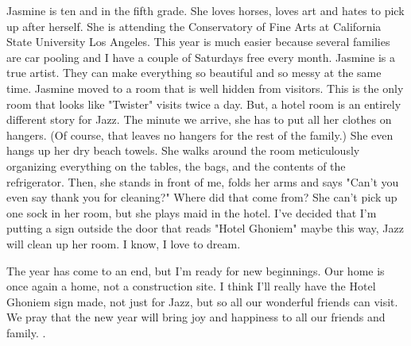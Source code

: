 Jasmine is ten and in the fifth grade.   She loves horses, loves art and hates to pick up after herself. She is attending the Conservatory of
Fine Arts at California State University Los Angeles. This year is much easier because several families are car pooling and I have a couple of
Saturdays free every month. Jasmine is a true artist. They can make everything so beautiful and so messy at the same time.   Jasmine moved to a
room that is well hidden from visitors. This is the only room that looks like "Twister" visits twice a day. But, a hotel room is an entirely
different story for Jazz. The minute we arrive, she has to put all her clothes on hangers. (Of course, that leaves no hangers for the rest of
the family.)   She even hangs up her dry beach towels. She walks around the room meticulously organizing everything on the tables, the bags, and
the contents of the refrigerator. Then, she stands in front of me, folds her arms and says "Can't you even say thank you for cleaning?"   Where
did that come from?   She can't pick up one sock in her room, but she plays maid in the hotel.   I've decided that I'm putting a sign outside
the door that reads "Hotel Ghoniem" maybe this way, Jazz will clean up her room.   I know, I love to dream.


The year has come to an end, but I'm ready for new beginnings.   Our home is once again a home, not a construction site.    I think I'll really
have the Hotel Ghoniem sign made, not just for Jazz, but so all our wonderful friends can visit.   We pray that the new year will bring joy and
happiness to all our friends and family. .

%
